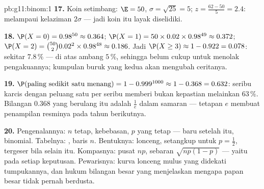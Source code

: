 \begin{solution}{pb:g11:binom:1}
\textbf{17.} Koin setimbang: $\E = 50$, $\sigma = \sqrt{25} = 5$;
$z = \frac{62 - 50}{5} = 2.4$: melampaui kelaziman $2\sigma$
--- jadi koin itu layak diselidiki.

\textbf{18.} $\P(X = 0) = 0.98^{50} \approx 0.364$;
$\P(X = 1) = 50 \times 0.02 \times 0.98^{49} \approx 0.372$;
$\P(X = 2) = \binom{50}{2} 0.02^2 \times 0.98^{48} \approx
0.186$. Jadi $\P(X \geq 3) \approx 1 - 0.922 = 0.078$: sekitar
$7.8\,\%$ --- di atas ambang $5\,\%$, sehingga belum
cukup untuk menolak pengakuannya; kumpulan buruk yang kedua akan mengubah
ceritanya.

\textbf{19.} $\P(\text{paling sedikit satu menang}) = 1 - 0.999^{1000}
\approx 1 - 0.368 = 0.632$: seribu karcis dengan peluang satu per
seribu memberi bukan kepastian melainkan $63\,\%$. Bilangan
$0.368$ yang berulang itu adalah $\frac1e$ dalam samaran --- tetapan $e$
membuat penampilan resminya pada tahun berikutnya.

\textbf{20.} Pengenalannya: $n$ tetap, kebebasan, $p$ yang
tetap --- baru setelah itu, binomial. Tabelnya: , baris $n$. Bentuknya: lonceng, setangkup untuk
$p = \frac12$, tergeser bila selain itu. Kompasnya: pusat $np$,
sebaran $\sqrt{np(1-p)}$ --- yaitu  pada setiap keputusan.
Pewarisnya: kurva lonceng mulus yang didekati tumpukannya, dan
hukum bilangan besar yang menjelaskan mengapa papan besar tidak pernah berdusta.

\end{solution}
